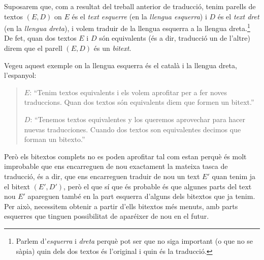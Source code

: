 Suposarem que, com a resultat del treball anterior de traducció, tenim
parells de textos $(E,D)$ on $E$ és el \emph{text esquerre} (en la
\emph{llengua esquerra}) i $D$ és el \emph{text dret} (en la
\emph{llengua dreta}), i volem traduir de la llengua esquerra a la
llengua dreta.\footnote{Parlem d'\emph{esquerra} i \emph{dreta} perquè pot ser que no siga important (o que no se sàpia) quin dels dos textos és l'original i quin és la traducció.}  De fet, quan dos textos $E$ i $D$ són equivalents (és a
dir, traducció un de l'altre) direm que el parell $(E,D)$ és un
\emph{bitext}.

Vegeu aquest exemple on la llengua esquerra és el català i la llengua
dreta, l'espanyol:
\begin{quote}
  $E$: ``Tenim textos equivalents i els volem aprofitar per a fer noves
      traduccions. Quan dos textos són equivalents diem que formen un
      bitext.''

  $D$: ``Tenemos textos equivalentes y los queremos aprovechar para hacer
      nuevas traducciones. Cuando dos textos son equivalentes decimos
      que forman un bitexto.''
\end{quote}

Però els bitextos complets no es poden aprofitar tal com estan perquè
és molt improbable que ens encarreguen de nou exactament la mateixa
tasca de traducció, és a dir, que ens encarreguen traduir de nou un
text $E'$ quan tenim ja el bitext $(E',D')$, però el que sí que és
probable és que algunes parts del text nou $E'$ apareguen també en la
part esquerra d'alguns dels bitextos que ja tenim. Per això,
necessitem obtenir a partir d'ells bitextos més menuts, amb parts esquerres que tinguen possibilitat de aparéixer de nou en el futur.

